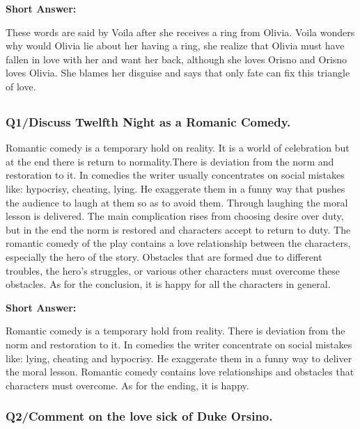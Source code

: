 \documentclass[12pt, a4paper]{article}
\begin{document}
\textbf{Short Answer:}\smallbreak

These words are said by Voila after she receives a ring from Olivia. Voila
wonders why would Olivia lie about her having a ring, she realize that 
Olivia must have fallen in love with her and want her back, although
she loves Orisno and Orisno loves Olivia. She blames  her disguise and 
says that only fate can fix this triangle of love.



\subsection*{}\bigbreak

\subsubsection*{Q1/Discuss Twelfth Night as a Romanic Comedy.}
Romantic comedy is a temporary hold on reality. It is a world of 
celebration but at the end there is return to normality.There is 
deviation from
the norm and restoration to it. In comedies the writer usually 
concentrates on social mistakes like: hypocrisy, cheating, lying. He
exaggerate them in a funny way that pushes the audience to laugh at them so as to avoid them. 
Through laughing the moral lesson is delivered. The main complication
rises from choosing desire over duty, but in the end the norm is
restored and characters accept to return to duty. The romantic comedy
of the play contains a love relationship between the characters, 
especially the hero of the story. Obstacles that are formed due to 
different troubles, the hero's struggles, or various other characters
must overcome these obstacles. As for the conclusion, it is happy for 
all the characters in general.\medbreak

\textbf{Short Answer:}\smallbreak

Romantic comedy is a temporary hold from reality. There is deviation from
the norm and restoration to it. In comedies the writer concentrate on
social mistakes like: lying, cheating and hypocrisy. He exaggerate them
in a funny way to deliver the moral lesson. Romantic comedy contains
love relationships and obstacles that characters must overcome. As
for the ending, it is happy.

\subsubsection*{Q2/Comment on the love sick of Duke Orsino.}
\end{document}
